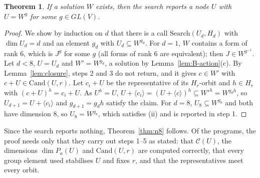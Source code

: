 \documentclass[11pt]{article}
\newtheorem{theorem}{Theorem}
\theoremstyle{definition}
\begin{document}
\begin{theorem}\label{thm:B-complete}
If a solution $W$ exists, then the search reports a node $U$ with $U=W^g$ for some
$g\in GL(V)$.
\end{theorem}
\begin{proof}
We show by induction on $d$ that there is a call $\mathrm{Search}(U_d,H_d)$ with
$\dim U_d=d$ and an element $g_d$ with $U_d\subseteq W^{g_d}$. For $d=1$, $W$ contains a form
of rank $6$, which is $J^{g}$ for some $g$ (all forms of rank $6$ are equivalent); then
$J\in W^{g^{-1}}$. Let $d<8$, $U=U_d$ and $W'=W^{g_d}$, a solution by
Lemma~\ref{lem:B-action}(c). By Lemma~\ref{lem:closure}, steps 2 and 3 do not return, and it
gives $c\in W'$ with $c+U\in\mathrm{Cand}(U,r)$. Let $c_i+U$ be the representative of its
$H_r$-orbit and $h\in H_r$ with $(c+U)^h=c_i+U$. As $U^h=U$,
$U+\langle c_i\rangle=(U+\langle c\rangle)^h\subseteq W'^h=W^{g_dh}$, so $U_{d+1}=U+\langle c_i\rangle$
and $g_{d+1}=g_dh$ satisfy the claim. For $d=8$, $U_8\subseteq W^{g_8}$ and both have dimension
$8$, so $U_8=W^{g_8}$, which satisfies (ii) and is reported in step 1.
\end{proof}
Since the search reports nothing, Theorem~\ref{thm:n8} follows. Of the programs, the proof
needs only that they carry out steps 1--5 as stated: that $\mathcal C(U)$, the dimensions
$\dim P_a(U)$ and $\mathrm{Cand}(U,r)$ are computed correctly, that every group element used
stabilises $U$ and fixes $r$, and that the representatives meet every orbit.
\end{document}
